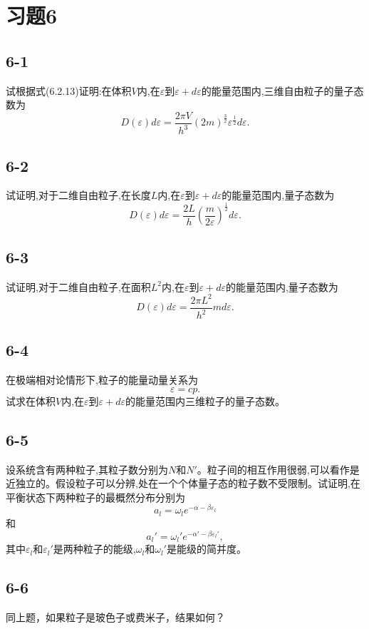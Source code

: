 \section{习题6}

\newpage
\subsection{6-1}
试根据式(6.2.13)证明:在体积$V$内,在$\varepsilon$到$\varepsilon+d\varepsilon$的能量范围内,三维自由粒子的量子态数为
$$D(\varepsilon)d\varepsilon = \frac{2\pi V}{h^3}(2m)^{\frac{3}{2}}\varepsilon^{\frac{1}{2}}d\varepsilon.$$

\newpage
\subsection{6-2}
试证明,对于二维自由粒子,在长度$L$内,在$\varepsilon$到$\varepsilon+d\varepsilon$的能量范围内,量子态数为
$$D(\varepsilon)d\varepsilon = \frac{2L}{h}\left(\frac{m}{2\varepsilon}\right)^{\frac{1}{2}}d\varepsilon.$$

\newpage
\subsection{6-3}
试证明,对于二维自由粒子,在面积$L^2$内,在$\varepsilon$到$\varepsilon + d\varepsilon$的能量范围内,量子态数为
$$D(\varepsilon) d\varepsilon = \frac{2\pi L^2}{h^2} m d\varepsilon.$$

\newpage
\subsection{6-4}
在极端相对论情形下,粒子的能量动量关系为
$$\varepsilon = cp.$$
试求在体积$V$内,在$\varepsilon$到$\varepsilon + d\varepsilon$的能量范围内三维粒子的量子态数。

\newpage
\subsection{6-5}
设系统含有两种粒子,其粒子数分别为$N$和$N'$。粒子间的相互作用很弱,可以看作是近独立的。假设粒子可以分辨,处在一个个体量子态的粒子数不受限制。试证明,在平衡状态下两种粒子的最概然分布分别为
$$a_l = \omega_l e^{-\alpha - \beta \varepsilon_l}$$
和
$$a_l' = \omega_l' e^{-\alpha' - \beta \varepsilon_l'},$$
其中$\varepsilon_l$和$\varepsilon_l'$是两种粒子的能级,$\omega_l$和$\omega_l'$是能级的简并度。

\newpage
\subsection{6-6}
同上题，如果粒子是玻色子或费米子，结果如何？